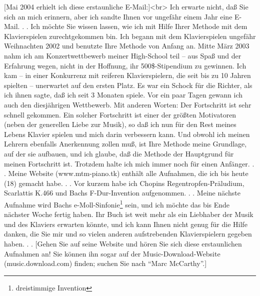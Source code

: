 [Mai 2004 erhielt ich diese erstaunliche E-Mail:]<br>
Ich erwarte nicht, daß Sie sich an mich erinnern, aber ich sandte Ihnen vor ungefähr einem Jahr eine E-Mail. . .
Ich möchte Sie wissen lassen, wie ich mit Hilfe Ihrer Methode mit dem Klavierspielen zurechtgekommen bin.
Ich begann mit dem Klavierspielen ungefähr Weihnachten 2002 und benutzte Ihre Methode von Anfang an.
Mitte März 2003 nahm ich am Konzertwettbewerb meiner High-School teil -- aus Spaß und der Erfahrung wegen, nicht in der Hoffnung, ihr 500\$-Stipendium zu gewinnen.
Ich kam -- in einer Konkurrenz mit reiferen Klavierspielern, die seit bis zu 10 Jahren spielten -- unerwartet auf den ersten Platz.
Es war ein Schock für die Richter, als ich ihnen sagte, daß ich seit 3 Monaten spiele.
Vor ein paar Tagen gewann ich auch den diesjährigen Wettbewerb.
Mit anderen Worten: Der Fortschritt ist sehr schnell gekommen.
Ein solcher Fortschritt ist einer der größten Motivatoren (neben der generellen Liebe zur Musik), 
so daß ich nun für den Rest meines Lebens Klavier spielen und mich darin verbessern kann.
Und obwohl ich meinen Lehrern ebenfalls Anerkennung zollen muß, ist Ihre Methode meine Grundlage, auf der sie aufbauen, und ich glaube, daß die Methode der Hauptgrund für meinen Fortschritt ist.
Trotzdem halte ich mich immer noch für einen Anfänger. . .
Meine Website (www.mtm-piano.tk) enthält alle Aufnahmen, die ich bis heute (18) gemacht habe. . .
Vor kurzem habe ich Chopins Regentropfen-Präludium, Scarlattis K.466 und Bachs F-Dur-Invention aufgenommen. . .
Meine nächste Aufnahme wird Bachs e-Moll-Sinfonie\footnote{dreistimmige Invention} sein, und ich möchte das bis Ende nächster Woche fertig haben.
Ihr Buch ist weit mehr als ein Liebhaber der Musik und des Klaviers erwarten könnte, und ich kann Ihnen nicht genug für die Hilfe danken, die Sie mir und so vielen anderen aufstrebenden Klavierspielern gegeben haben. . .
[Gehen Sie auf seine Website und hören Sie sich diese erstaunlichen Aufnahmen an!
Sie können ihn sogar auf der Music-Download-Website (music.download.com) finden; suchen Sie nach \enquote{Marc McCarthy}.]


